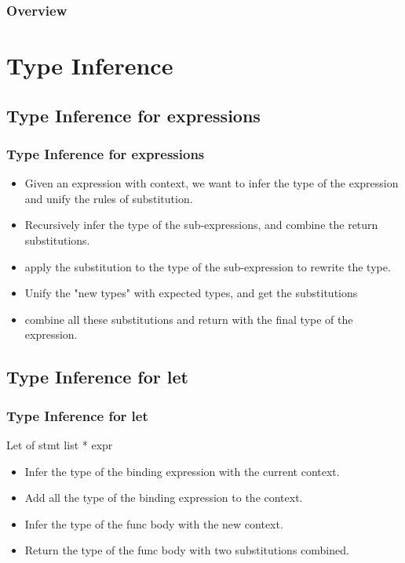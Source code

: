 \documentclass[t]{beamer}
\begin{document}
    \begin{frame}
        \frametitle{Overview}
        \tableofcontents
    \end{frame}




    \section{Type Inference}
    \subsection{Type Inference for expressions}
    \begin{frame}
        \frametitle{Type Inference for expressions}
        \begin{itemize}
            \item Given an expression with context, we want to infer the type of the expression and unify the rules of substitution.
            \item Recursively infer the type of the sub-expressions, and combine the return substitutions.
            \item apply the substitution to the type of the sub-expression to rewrite the type.
            \item Unify the "new types" with expected types, and get the substitutions
            \item combine all these substitutions and return with the final type of the expression.
        \end{itemize}
    \end{frame}

    \subsection{Type Inference for let}
    \begin{frame}
        \frametitle{Type Inference for let}
        {\ttfamily Let of stmt list * expr}
        \begin{itemize}
            \item Infer the type of the binding expression with the current context.
            \item Add all the type of the binding expression to the context.
            \item Infer the type of the func body with the new context.
            \item Return the type of the func body with two substitutions combined.
        \end{itemize}
    \end{frame}
\end{document}
